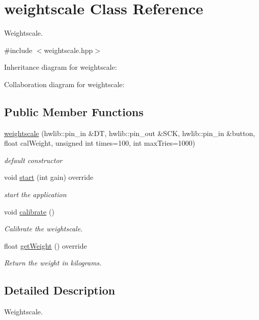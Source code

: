 \hypertarget{classweightscale}{}\section{weightscale Class Reference}
\label{classweightscale}


Weightscale.  




{\ttfamily \#include $<$weightscale.\+hpp$>$}



Inheritance diagram for weightscale\+:


Collaboration diagram for weightscale\+:
\subsection*{Public Member Functions}
\begin{DoxyCompactItemize}
\item 
\hyperlink{classweightscale_a9d0086222cb067092a3c5f0ebd59cecb}{weightscale} (hwlib\+::pin\+\_\+in \&DT, hwlib\+::pin\+\_\+out \&S\+CK, hwlib\+::pin\+\_\+in \&button, float cal\+Weight, unsigned int times=100, int max\+Tries=1000)
\begin{DoxyCompactList}\small\item\em default constructor \end{DoxyCompactList}\item 
void \hyperlink{classweightscale_a1ba11d72b8488af4b25228ff21561dc7}{start} (int gain) override
\begin{DoxyCompactList}\small\item\em start the application \end{DoxyCompactList}\item 
void \hyperlink{classweightscale_a3110537ecd03d645d30660f5dbd9435b}{calibrate} ()
\begin{DoxyCompactList}\small\item\em Calibrate the weightscale. \end{DoxyCompactList}\item 
float \hyperlink{classweightscale_a8ca1a617d9b677088fb45b8b621c6570}{get\+Weight} () override
\begin{DoxyCompactList}\small\item\em Return the weight in kilograms. \end{DoxyCompactList}\end{DoxyCompactItemize}


\subsection{Detailed Description}
Weightscale. 


